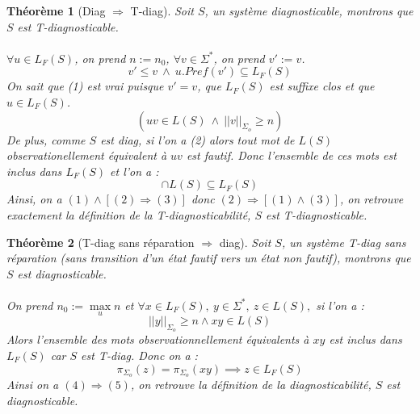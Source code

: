 \documentclass[conference]{IEEEtran}
\newtheorem{myth}{Th\'eor\`eme}
\begin{document}
\begin{myth}[Diag $\Rightarrow$ T-diag]

Soit $S$, un système diagnosticable, montrons que $S$ est T-diagnosticable. 
\paragraph{}
\noindent $\forall u \in L_{F}(S)$, on prend $n := n_0$, $\forall v \in \Sigma^*$, on prend $v' := v$. 
\begin{equation}
v'\leq v \ \wedge \  u.Pref(v') \subseteq L_F(S)
\end{equation}
On sait que (1) est vrai puisque $v'=v$, que $L_F(S)$ est suffixe clos et que $u \in L_F(S)$.
\begin{equation}
(uv \in L(S) \ \wedge \  ||v||_{\Sigma_o}\geq n)
\end{equation}
De plus, comme $S$ est diag, si l'on a (2) alors tout mot de $L(S)$ observationellement équivalent à $uv$ est fautif. Donc l'ensemble de ces mots est inclus dans $L_F(S)$ et l'on a :
\begin{equation}
[uv'] \cap L(S) \subseteq L_F(S)
\end{equation}
Ainsi, on a $(1) \wedge [ (2)  \Rightarrow (3) ]$ donc $(2)  \Rightarrow [ (1) \wedge (3) ]$, on retrouve exactement la définition de la T-diagnosticabilité, $S$ est T-diagnosticable.
\end{myth}
\begin{myth}[T-diag sans r\'eparation $\Rightarrow$ diag]
Soit $S$, un système T-diag sans réparation (sans transition d'un état fautif vers un état non fautif), montrons que $S$ est diagnosticable.
\paragraph{}
\noindent On prend $n_0:= \max\limits_{u} n$ et
$\forall x \in L_F(S),\ y \in \Sigma^*,\ z \in L(S),$ si l'on a :
\begin{equation}
||y||_{\Sigma_o} \ge n \land xy \in  L(S) 
\end{equation}
Alors l'ensemble des mots observationnellement équivalents à $xy$ est inclus dans $L_F(S)$ car $S$ est T-diag. Donc on a :
\begin{equation}
 \pi_{\Sigma_o}(z)=\pi_{\Sigma_o}(xy) \implies z \in L_F(S)
\end{equation}
Ainsi on a $(4) \Rightarrow (5)$, on retrouve la définition de la diagnosticabilité, $S$ est diagnosticable.
\end{myth}
\end{document}
